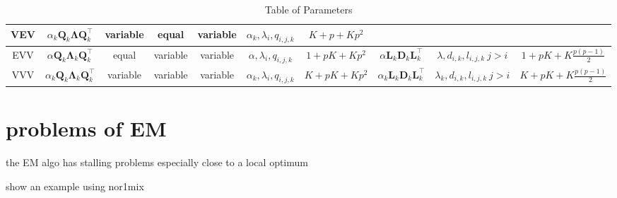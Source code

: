 \begin{table}[!htb]
{\begin{tabular}{| c | c c c c c c | c c c |}
		VEV	& $ \alpha_k \pmb{Q}_k \pmb{\Lambda} \pmb{Q}_k^\top $ &variable & equal & variable & $ \alpha_k, \lambda_{i}, q_{i,j,k} $ 
				& $ K+p+Kp^2 $ &
					& & \\

		\hline

		EVV	& $ \alpha \pmb{Q}_k \pmb{\Lambda}_k \pmb{Q}_k^\top $ & equal & variable & variable & $ \alpha, \lambda_{i}, q_{i,j,k} $ 
				& $ 1+pK+Kp^2 $ & $ \alpha \pmb{L}_k \pmb{D}_k \pmb{L}_k^\top $ 
					& $ \lambda, d_{i,k}, l_{i,j,k}\ j>i $ & $ 1+pK+K\frac{p(p-1)}{2} $ \\

		VVV	& $ \alpha_k \pmb{Q}_k \pmb{\Lambda}_k \pmb{Q}_k^\top $ & variable & variable & variable & $ \alpha_k, \lambda_{i}, q_{i,j,k} $ 
				& $ K+pK+Kp^2 $ & $ \alpha_k \pmb{L}_k \pmb{D}_k \pmb{L}_k^\top $ 
					& $ \lambda_k, d_{i,k}, l_{i,j,k}\ j>i $ & $ K+pK+K\frac{p(p-1)}{2} $ \\

		\hline

	\end{tabular}

	\label{table:1}

}

\caption{Table of Parameters}

\end{table}


\clearpage

\section{problems of EM}


the EM algo has stalling problems especially close to a local optimum

show an example using nor1mix


